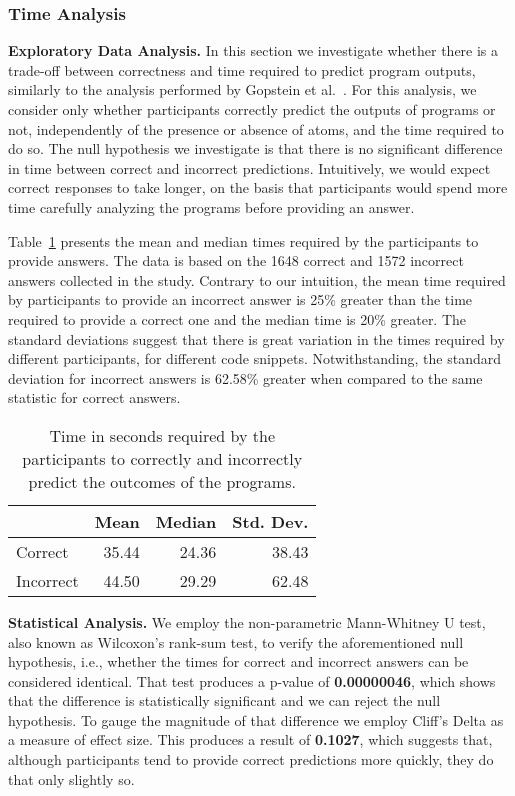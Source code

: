 \subsubsection{Time Analysis}\label{sec:repeated:time}

{\bf Exploratory Data Analysis.}
In this section we investigate whether there is a trade-off between correctness and time required to predict program outputs, similarly to the analysis performed by Gopstein et al.~\cite{DBLP:conf/sigsoft/GopsteinIYDZYC17}. For this analysis, we consider only whether participants correctly predict the outputs of programs or not, independently of the presence or absence of atoms, and the time required to do so. The null hypothesis we investigate is that there is no significant difference in time between correct and incorrect predictions. Intuitively, we would expect correct responses to take longer, on the basis that participants would spend more time carefully analyzing the programs before providing an answer. 

Table~\ref{tab:repeated:time} presents the mean and median times required by the participants to provide answers. The data is based on the 1648 correct and 1572 incorrect answers collected in the study. Contrary to our intuition, the mean time required by participants to provide an incorrect answer is 25\% greater than the time required to provide a correct one and the median time is 20\% greater. The standard deviations suggest that there is great variation in the times required by different participants, for different code snippets. Notwithstanding, the standard deviation for incorrect answers is 62.58\% greater when compared to the same statistic for correct answers. 

\begin{table}[tb]
  \caption{Time in seconds required by the participants to correctly and incorrectly predict the outcomes of the programs.}\label{tab:repeated:time}
  \centering
  {\scriptsize 
  \begin{tabular}{lrrr}
    \toprule  
             & Mean  & Median & Std. Dev. \\
    \midrule
  Correct   & 35.44 & 24.36  & 38.43     \\
  Incorrect & 44.50 & 29.29  & 62.48    \\
  \bottomrule
  \end{tabular}
}
  \end{table}

{\bf Statistical Analysis.}
We employ the non-parametric Mann-Whitney U test, also known as Wilcoxon's rank-sum test, to verify the aforementioned null hypothesis, i.e., whether the times for correct and incorrect answers can be considered identical. That test produces a p-value of \textbf{0.00000046}, which shows that the difference is statistically significant and we can reject the null hypothesis. To gauge the magnitude of that difference we employ Cliff's Delta as a measure of effect size. This produces a result of \textbf{0.1027}, which suggests that, although participants tend to provide correct predictions more quickly, they do that only slightly so. 
